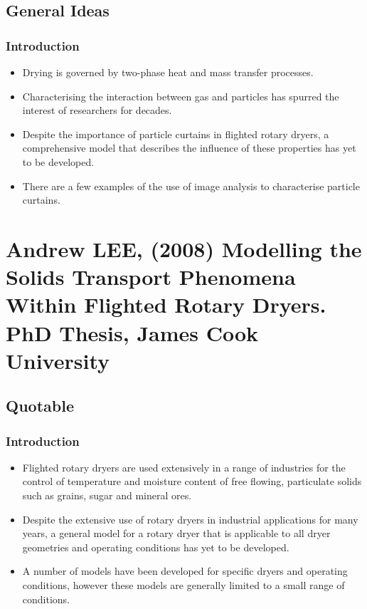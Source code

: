 \documentclass[12pt]{article}
\begin{document}
		
		
	
	\subsection{General Ideas}
	
		\subsubsection{Introduction}
			\begin{itemize}
				\item Drying is governed by two-phase heat and mass transfer processes.
				
				\item Characterising the interaction between gas and particles has spurred the interest of researchers for
				decades.
				
				\item Despite the importance of particle curtains in flighted rotary dryers, a
				comprehensive model that describes the influence of these properties has yet to be developed.
				\item There are a few examples of the use of image analysis to characterise particle curtains.
			\end{itemize}


\section{Andrew LEE, (2008) Modelling the Solids Transport Phenomena Within Flighted Rotary Dryers. PhD Thesis, James Cook University}

	\subsection{Quotable}
	
	\subsubsection{Introduction}
	\begin{itemize}
		\item Flighted rotary dryers are used extensively in a range of industries for the control of
		temperature and moisture content of free flowing, particulate solids such as grains,
		sugar and mineral ores. 
		
		\item Despite the extensive use of rotary dryers in industrial applications for many years, a
		general model for a rotary dryer that is applicable to all dryer geometries and
		operating conditions has yet to be developed.
		
		\item A number of models have been
		developed for specific dryers and operating conditions, however these models are
		generally limited to a small range of conditions.
	\end{itemize}
	
\end{document}
